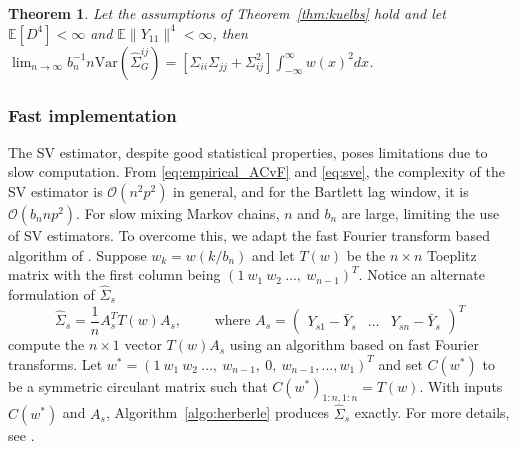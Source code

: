 \documentclass[11pt]{article}
\newcommand{\E}{\mathbb{E}}
\newcommand{\Var}{\text{Var}}
\newtheorem{theorem}{Theorem}
\theoremstyle{remark}
\begin{document}
\begin{theorem} \label{th:G-SVE_variance}
 Let the assumptions of Theorem~\ref{thm:kuelbs} hold and let $\E[D^4] < \infty$  and  $\E \|Y_{11}\|^4 < \infty$, then $ \lim_{n \to \infty} b_n^{-1}{n}\Var \left(\hat{\Sigma}_{G}^{ij} \right) = [\Sigma_{ii}\Sigma_{jj} + \Sigma_{ij}^2]\int_{-\infty}^{\infty}w(x)^2dx $.
\end{theorem}


\subsubsection{Fast implementation} %
\label{ssub:fast_implementation}

The SV estimator, despite good statistical properties, poses limitations due to slow computation. From \eqref{eq:empirical_ACvF} and \eqref{eq:sve}, the complexity of the SV estimator is $\mathcal{O}(n^2 p^2)$ in general, and for the Bartlett lag window, it is $\mathcal{O}(b_n n p^2)$. For slow mixing Markov chains, $n$ and $b_n$ are large, limiting the use of SV estimators.  To overcome this, we adapt the  fast Fourier transform based algorithm of \cite{heberle2017fast}. Suppose $w_k = w(k/b_n)$ and let $T(w)$ be the $n \times n$ Toeplitz matrix with the first column being $(1 ~ w_1 ~ w_2 ~ \dots, ~ w_{n-1})^T$. Notice an alternate formulation of $\hat{\Sigma}_s$
%
\begin{equation} \label{eq:kyriakoulis}
    \hat{\Sigma}_s = \dfrac{1}{n}A_s^T T(w) A_s, \qquad \textrm{ where } A_s = \begin{pmatrix}
    Y_{s1} - \bar{Y}_s  & \dots & Y_{sn} - \bar{Y}_s
\end{pmatrix}^T
\end{equation}
 \cite{heberle2017fast} compute the $n \times 1$ vector $T(w)A_s$  using an algorithm based on fast Fourier transforms. Let $w^* = (1 ~ w_1 ~ w_2 ~ \dots, ~ w_{n-1}, ~0, ~w_{n-1}, \dots, w_1)^T$ and set $C(w^*)$ to be a symmetric circulant matrix such that $C(w^*)_{1:n, 1:n} = T(w)$.  With inputs $C(w^*)$ and $A_s$, Algorithm~\ref{algo:herberle} produces $\hat{\Sigma}_s$ exactly. For more details, see \cite{heberle2017fast}.
\end{document}
